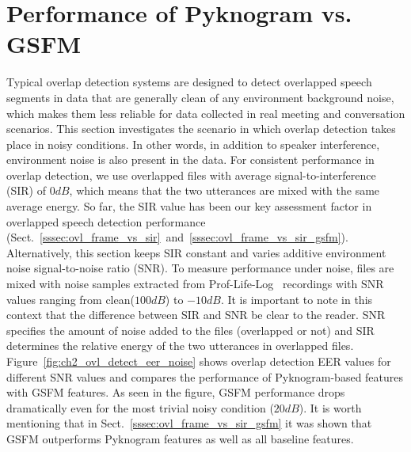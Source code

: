 {\newpage
\section{Performance of Pyknogram vs. GSFM}
\label{sec:ch2_Pykno_vs_GSFM}
Typical overlap detection systems are designed to detect overlapped speech segments in data that are generally clean of any environment background noise, which makes them less reliable for data collected in real meeting and conversation scenarios. 
This section investigates the scenario in which overlap detection takes place in noisy conditions. 
In other words, in addition to speaker interference, environment noise is also present in the data. 
For consistent performance in overlap detection, we use overlapped files with average signal-to-interference (SIR) of $0dB$, which means that the two utterances are mixed with the same average energy. 
So far, the SIR value has been our key assessment factor in overlapped speech detection performance (Sect.~\ref{sssec:ovl_frame_vs_sir}~and~\ref{sssec:ovl_frame_vs_sir_gsfm}).
Alternatively, this section keeps SIR constant and varies additive environment noise signal-to-noise ratio (SNR).
To measure performance under noise, files are mixed with noise samples extracted from Prof-Life-Log~\cite{ziaei2013prof} recordings with SNR values ranging from clean($100dB$) to $-10dB$. 
It is important to note in this context that the difference between SIR and SNR be clear to the reader. 
SNR specifies the amount of noise added to the files (overlapped or not) and SIR determines the relative energy of the two utterances in overlapped files. 
Figure~\ref{fig:ch2_ovl_detect_eer_noise} shows overlap detection EER values for different SNR values and compares the performance of Pyknogram-based features with GSFM features. 
As seen in the figure, GSFM performance drops dramatically even for the most trivial noisy condition ($20dB$). 
It is worth mentioning that in Sect.~\ref{sssec:ovl_frame_vs_sir_gsfm} it was shown that GSFM outperforms Pyknogram features as well as all baseline features. 

}
